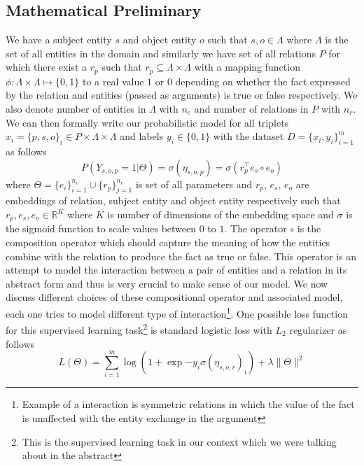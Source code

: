 \documentclass[12pt]{article}
\begin{document}
\subsection{Mathematical Preliminary}
We have a subject entity $s$ and object entity $o$ such that $s, o \in \Lambda$ where $\Lambda$ is the set of all entities in the domain and similarly we have set of all relations $P$ for which there exist a $r_{p}$ such that $r_{p} \subseteq \Lambda \times \Lambda $ with a mapping function $\phi: \Lambda \times \Lambda \mapsto \{0, 1\}$ to a real value $1$ or $0$ depending on whether the fact expressed by the relation and entities (passed as arguments) is true or false respectively. We also denote number of entities in $\Lambda$ with $n_{e}$ and number of relations in $P$ with $n_{r}$. We can then formally write our probabilistic model for all triplets $x_{i} = \{p, s, o\}_{i} \in P \times \Lambda \times \Lambda$ and labels $y_{i} \in \{0, 1\}$ with the dataset $D=\{x_{i}, y_{i}\}_{i=1}^{m}$ as follows
\begin{equation}
P(Y_{s, o, p}=1 | \Theta) = \sigma(\eta_{s, o, p}) = \sigma(r_{p}^{\intercal}e_{s}\circ e_{o})
\end{equation} where $\Theta=\{e_{i}\}_{i=1}^{n_{e}}\cup \{r_{p}\}_{j=1}^{n_{r}}$ is set of all parameters and $r_{p}$, $e_{s}$, $e_{o}$ are embeddings of relation, subject entity and object entity respectively such that $r_{p}, e_{s}, e_{o} \in \mathbb{R}^{K}$ where $K$ is number of dimensions of the embedding space and $\sigma$ is the sigmoid function to scale values between $0$ to $1$. The operator $\circ$ is the composition operator which should capture the meaning of how the entities combine with the relation to produce the fact as true or false. This operator is an attempt to model the interaction between a pair of entities and a relation in its abstract form and thus is very crucial to make sense of our model. We now discuss different choices of these compositional operator and associated model, each one tries to model different type of interaction\footnote{Example of a interaction is symmetric relations in which the value of the fact is unaffected with the entity exchange in the argument}. One possible loss function for this supervised learning task\footnote{This is the supervised learning task in our context which we were talking about in the abstract} is standard logistic loss with $L_{2}$ regularizer as follows
\begin{equation}
L(\Theta) = \sum_{i=1}^{m}\log(1+\exp{-y_{i}\sigma(\eta_{s, o, r})_{i}}) + \lambda\|\Theta\|^{2}
\end{equation}
\end{document}
